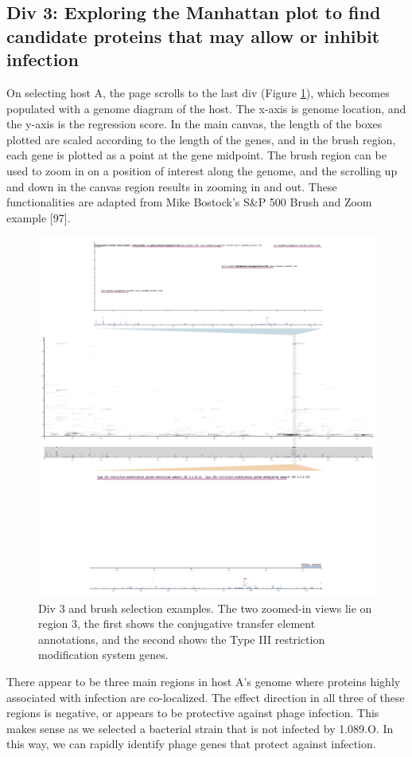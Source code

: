 \documentclass[12pt,twoside]{mitthesis-manusdown}
\begin{document}
\subsection{Div 3: Exploring the Manhattan plot to find candidate
proteins that may allow or inhibit
infection}\label{div-3-exploring-the-manhattan-plot-to-find-candidate-proteins-that-may-allow-or-inhibit-infection}

On selecting host A, the page scrolls to the last div (Figure
\ref{fig:workflow3}), which becomes populated with a genome diagram of
the host. The x-axis is genome location, and the y-axis is the
regression score. In the main canvas, the length of the boxes plotted
are scaled according to the length of the genes, and in the brush
region, each gene is plotted as a point at the gene midpoint. The brush
region can be used to zoom in on a position of interest along the
genome, and the scrolling up and down in the canvas region results in
zooming in and out. These functionalities are adapted from Mike
Bostock's S\&P 500 Brush and Zoom example {[}97{]}.
\begin{figure}[tb!]

{\centering \includegraphics[width=0.8\linewidth]{figuresviz/workflow3} 

}

\caption{\label{fig:workflow3}Div 3 and brush selection examples. The two zoomed-in views lie on region 3, the first shows the conjugative transfer element annotations, and the second shows the Type III restriction modification system genes.}\label{fig:workflow3}
\end{figure}
There appear to be three main regions in host A's genome where proteins
highly associated with infection are co-localized. The effect direction
in all three of these regions is negative, or appears to be protective
against phage infection. This makes sense as we selected a bacterial
strain that is not infected by 1.089.O. In this way, we can rapidly
identify phage genes that protect against infection.
\end{document}
